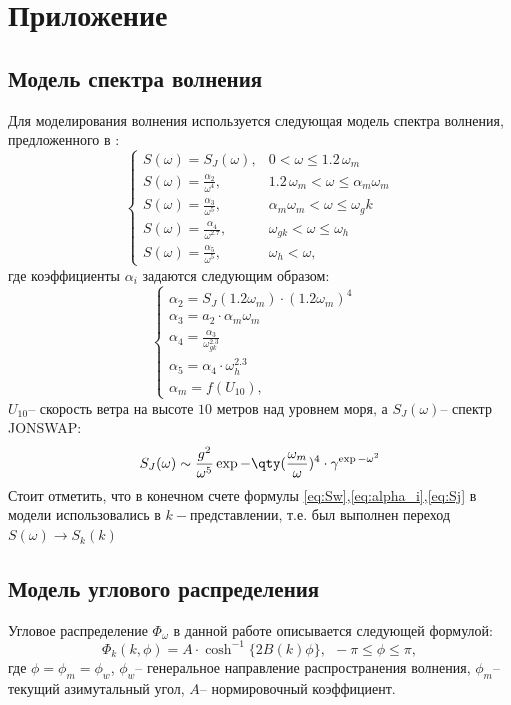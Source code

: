\appendix
\section{Приложение}
\label{model}
\subsection{Модель спектра волнения}

Для моделирования волнения используется следующая модель спектра волнения, предложенного в \cite{Karaev2}: 
\begin{equation}
	\label{eq:Sw}
	\begin{cases}
		S(\omega)=S_J(\omega), &  0<\omega\leq 1.2\,\omega_m\\
		S(\omega)= \frac{\alpha_2}{\omega^4}, &  1.2 \,\omega_m < \omega \leq \alpha_m \omega_m\\
		S(\omega)= \frac{\alpha_3}{\omega^5}, &   \alpha_m \omega_m< \omega \leq \omega_gk\\
		S(\omega)= \frac{\alpha_4}{\omega^{2.7}}, & \omega_{gk}<\omega\leq \omega_h\\
		S(\omega)= \frac{\alpha_5}{\omega^5}, & \omega_h<\omega,
	\end{cases}
\end{equation}
где коэффициенты $\alpha_i$ задаются следующим образом:
\begin{equation}
	\label{eq:alpha_i}
	\begin{cases}
		\alpha_2=S_J(1.2 \omega_m)\cdot (1.2 \omega_m)^4 \\
		\alpha_3=a_2\cdot \alpha_m \omega_m \\
		\alpha_4= \frac{\alpha_3}{\omega^{2.3}_{gk}} \\
		\alpha_5 = \alpha_4 \cdot \omega_h^{2.3} \\
		\alpha_m = f(U_{10}), & 
	\end{cases}
\end{equation}
$U_{10} \text{-- скорость ветра на высоте 10 метров над уровнем моря,}$ а $S_J(\omega)$-- спектр JONSWAP:
\begin{equation}
\label{eq:Sj}
	S_J(\omega)\sim \frac{g^2}{\omega^{5}}\exp{-\qty(\frac{\omega_m}{\omega})^4}
	\cdot \gamma^{\exp{-\omega^2}}
\end{equation}
Стоит отметить, что в конечном счете формулы \eqref{eq:Sw},\eqref{eq:alpha_i},\eqref{eq:Sj} в модели использовались в $k-$представлении, т.е.  был выполнен переход $S(\omega)\rightarrow S_k(k)$


\subsection{Модель углового распределения}
Угловое распределение $\Phi_{\omega}$ в данной работе описывается следующей формулой:
\begin{equation}
	\Phi_{k} (k, \phi)= A\cdot \cosh^{-1}\{2B(k) \phi\}, ~~ -\pi\leq \phi \leq \pi,
\end{equation}
где $\phi=\phi_m = \phi_w$, $\phi_w$-- генеральное направление распространения волнения,
$\phi_m$-- текущий азимутальный угол, $A$-- нормировочный коэффициент.




